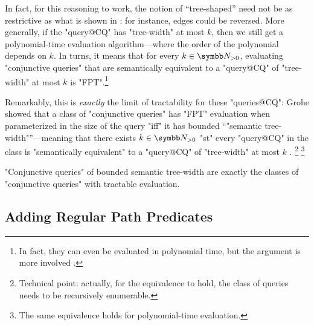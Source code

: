 In fact, for this reasoning to work, the notion of ``tree-shaped'' need not
be as restrictive as what is shown in : for instance,
edges could be reversed. More generally, if the "query@CQ" has "tree-width"
at most $k$, then we still get a polynomial-time evaluation algorithm---where the order
of the polynomial depends on $k$. In turns, it means that for every $k\in\Np$,
evaluating "conjunctive queries" that are semantically equivalent to
a "query@CQ" of "tree-width" at most $k$ is "FPT".\footnote{In fact,
they can even be evaluated in polynomial time, but the argument is more involved
\cite{ChekuriRajaraman2000Containment}.}

Remarkably, this is \emph{exactly} the limit of tractability for these "queries@CQ":
Grohe showed that a class of "conjunctive queries" has "FPT" evaluation when parameterized in the 
size of the query "iff"
it has bounded ``"semantic tree-width"''---meaning that there exists $k\in\Np$ "st"
every "query@CQ" in the class is "semantically equivalent" to a "query@CQ" 
of "tree-width" at most $k$ \cite{Grohe2007ComplexityHomomorphism}.%
\footnote{Technical point: actually, for the equivalence to hold, the class of queries
needs to be recursively enumerable.}%
\footnote{The same equivalence holds for polynomial-time evaluation.}

\begin{known}
	"Conjunctive queries" of bounded semantic tree-width are exactly
	the classes of "conjunctive queries" with tractable evaluation.
\end{known}


\subsection{Adding Regular Path Predicates}

